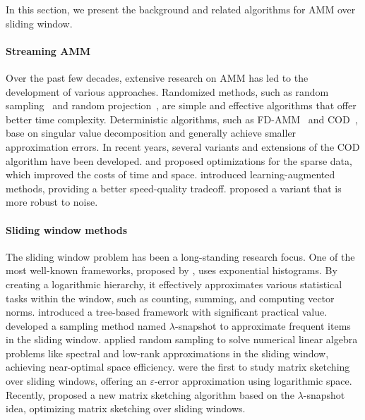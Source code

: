 In this section, we present the background and related algorithms for AMM over sliding window.
\paragraph{Streaming AMM}
Over the past few decades, extensive research on AMM has led to the development of various approaches. Randomized methods, such as random sampling~\cite{drineas2006fast} and random projection~\cite{sarlos2006improved, cohen2015optimal}, are simple and effective algorithms that offer better time complexity. Deterministic algorithms, such as FD-AMM~\cite{ye2016frequent} and COD~\cite{mroueh2017co}, base on singular value decomposition and generally achieve smaller approximation errors. In recent years, several variants and extensions of the COD algorithm have been developed. \citet{wan2021approximate} and \citet{luo2021revisiting} proposed optimizations for the sparse data, which improved the costs of time and space. \citet{blalock2021multiplying} introduced learning-augmented methods, providing a better speed-quality tradeoff. \citet{francis2022practical} proposed a variant that is more robust to noise.
\paragraph{Sliding window methods}
The sliding window problem has been a long-standing research focus. One of the most well-known frameworks, proposed by \citet{datar2002maintaining}, uses exponential histograms. By creating a logarithmic hierarchy, it effectively approximates various statistical tasks within the window, such as counting, summing, and computing vector norms. \citet{arasu2004approximate} introduced a tree-based framework with significant practical value. \citet{lee2006simpler} developed a sampling method named $\lambda$-snapshot to approximate frequent items in the sliding window. \citet{braverman2020near} applied random sampling to solve numerical linear algebra problems like spectral and low-rank approximations in the sliding window, achieving near-optimal space efficiency. \citet{wei2016matrix} were the first to study matrix sketching over sliding windows, offering an $\varepsilon$-error approximation using logarithmic space. Recently, \citet{yin2024optimal} proposed a new matrix sketching algorithm based on the $\lambda$-snapshot idea, optimizing matrix sketching over sliding windows.

